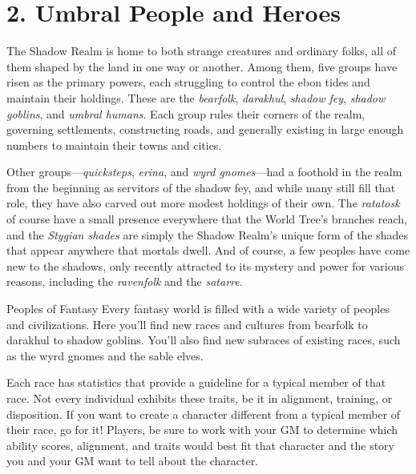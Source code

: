 \documentclass[10pt,a4paper,twoside,bg=print,twocolumn,openany,nodeprecatedcode]{dndbook}
\begin{document}
\chapter{2. Umbral People and Heroes}
The Shadow Realm is home to both strange creatures and ordinary folks, all of them shaped by the land in one way or another. Among them, five groups have risen as the primary powers, each struggling to control the ebon tides and maintain their holdings. These are the \textit{bearfolk}, \textit{darakhul}, \textit{shadow fey}, \textit{shadow goblins}, and \textit{umbral humans}. Each group rules their corners of the realm, governing settlements, constructing roads, and generally existing in large enough numbers to maintain their towns and cities.

Other groups—\textit{quicksteps}, \textit{erina}, and \textit{wyrd gnomes}—had a foothold in the realm from the beginning as servitors of the shadow fey, and while many still fill that role, they have also carved out more modest holdings of their own. The \textit{ratatosk} of course have a small presence everywhere that the World Tree's branches reach, and the \textit{Stygian shades} are simply the Shadow Realm's unique form of the shades that appear anywhere that mortals dwell. And of course, a few peoples have come new to the shadows, only recently attracted to its mystery and power for various reasons, including the \textit{ravenfolk} and the \textit{satarre}.

\begin{DndSidebar}[float=!b]{Peoples of Fantasy}
Every fantasy world is filled with a wide variety of peoples and civilizations. Here you'll find new races and cultures from bearfolk to darakhul to shadow goblins. You'll also find new subraces of existing races, such as the wyrd gnomes and the sable elves.



Each race has statistics that provide a guideline for a typical member of that race. Not every individual exhibits these traits, be it in alignment, training, or disposition. If you want to create a character different from a typical member of their race, go for it! Players, be sure to work with your GM to determine which ability scores, alignment, and traits would best fit that character and the story you and your GM want to tell about the character.



\end{DndSidebar}
\end{document}
